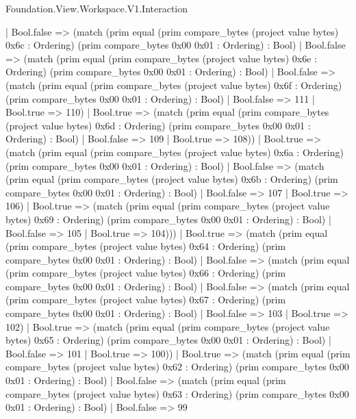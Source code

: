 \begin{lexlean}{Foundation.View.Workspace.V1.Interaction}
\begin{semanticmodule}
{              | Bool.false => (match (prim equal (prim compare_bytes (project value bytes) 0x6c : Ordering) (prim compare_bytes 0x00 0x01 : Ordering) : Bool)
                | Bool.false => (match (prim equal (prim compare_bytes (project value bytes) 0x6e : Ordering) (prim compare_bytes 0x00 0x01 : Ordering) : Bool)
                  | Bool.false => (match (prim equal (prim compare_bytes (project value bytes) 0x6f : Ordering) (prim compare_bytes 0x00 0x01 : Ordering) : Bool)
                    | Bool.false => 111
                    | Bool.true => 110)
                  | Bool.true => (match (prim equal (prim compare_bytes (project value bytes) 0x6d : Ordering) (prim compare_bytes 0x00 0x01 : Ordering) : Bool)
                    | Bool.false => 109
                    | Bool.true => 108))
                | Bool.true => (match (prim equal (prim compare_bytes (project value bytes) 0x6a : Ordering) (prim compare_bytes 0x00 0x01 : Ordering) : Bool)
                  | Bool.false => (match (prim equal (prim compare_bytes (project value bytes) 0x6b : Ordering) (prim compare_bytes 0x00 0x01 : Ordering) : Bool)
                    | Bool.false => 107
                    | Bool.true => 106)
                  | Bool.true => (match (prim equal (prim compare_bytes (project value bytes) 0x69 : Ordering) (prim compare_bytes 0x00 0x01 : Ordering) : Bool)
                    | Bool.false => 105
                    | Bool.true => 104)))
              | Bool.true => (match (prim equal (prim compare_bytes (project value bytes) 0x64 : Ordering) (prim compare_bytes 0x00 0x01 : Ordering) : Bool)
                | Bool.false => (match (prim equal (prim compare_bytes (project value bytes) 0x66 : Ordering) (prim compare_bytes 0x00 0x01 : Ordering) : Bool)
                  | Bool.false => (match (prim equal (prim compare_bytes (project value bytes) 0x67 : Ordering) (prim compare_bytes 0x00 0x01 : Ordering) : Bool)
                    | Bool.false => 103
                    | Bool.true => 102)
                  | Bool.true => (match (prim equal (prim compare_bytes (project value bytes) 0x65 : Ordering) (prim compare_bytes 0x00 0x01 : Ordering) : Bool)
                    | Bool.false => 101
                    | Bool.true => 100))
                | Bool.true => (match (prim equal (prim compare_bytes (project value bytes) 0x62 : Ordering) (prim compare_bytes 0x00 0x01 : Ordering) : Bool)
                  | Bool.false => (match (prim equal (prim compare_bytes (project value bytes) 0x63 : Ordering) (prim compare_bytes 0x00 0x01 : Ordering) : Bool)
                    | Bool.false => 99
}
\end{semanticmodule}
\end{lexlean}
